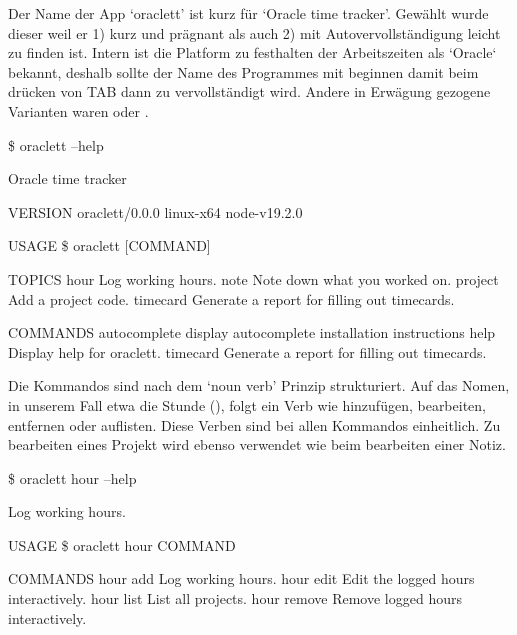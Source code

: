\documentclass[oneside,bibliography=totocnumbered,BCOR=5mm]{scrbook}
\newenvironment{code}{\captionsetup{type=listing, skip=0pt}}{}
\begin{document}
\medskip

Der Name der App `oraclett' ist kurz für `Oracle time tracker'. Gewählt wurde
dieser weil er 1) kurz und prägnant als auch 2) mit Autovervollständigung leicht
zu finden ist. Intern ist die Platform zu festhalten der Arbeitszeiten als
`Oracle` bekannt, deshalb sollte der Name des Programmes mit 
beginnen damit beim drücken von TAB dann zu 
vervollständigt wird. Andere in Erwägung gezogene Varianten waren
 oder .

\begin{code}
  \medskip
  \label{code:oraclett-help}
  \begin{shellcode}
  \$ oraclett --help

  Oracle time tracker

  VERSION
    oraclett/0.0.0 linux-x64 node-v19.2.0

  USAGE
    \$ oraclett [COMMAND]

  TOPICS
    hour      Log working hours.
    note      Note down what you worked on.
    project   Add a project code.
    timecard  Generate a report for filling out timecards.

  COMMANDS
    autocomplete  display autocomplete installation instructions
    help          Display help for oraclett.
    timecard      Generate a report for filling out timecards.
  \end{shellcode}
\end{code}

Die Kommandos sind nach dem `noun verb' Prinzip \parencite{clig} strukturiert.
Auf das Nomen, in unserem Fall etwa die Stunde (), folgt
ein Verb wie hinzufügen, bearbeiten, entfernen oder auflisten. Diese Verben
sind bei allen Kommandos einheitlich. Zu bearbeiten eines Projekt wird ebenso
 verwendet wie beim bearbeiten einer Notiz.

\begin{code}
  \label{code:hours-help}
  \begin{shellcode}
  \$ oraclett hour --help

  Log working hours.

  USAGE
    \$ oraclett hour COMMAND

  COMMANDS
    hour add     Log working hours.
    hour edit    Edit the logged hours interactively.
    hour list    List all projects.
    hour remove  Remove logged hours interactively.
  \end{shellcode}
  \medskip
\end{code}
\end{document}
